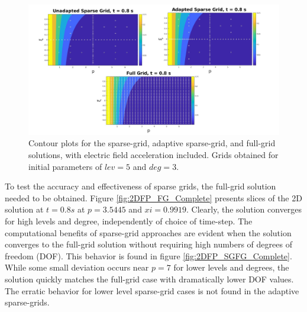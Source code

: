 \documentclass[preprint,11pt]{elsarticle}
\begin{document}
\begin{figure}[H]
    \centering
    \includegraphics[width=1.1\textwidth]{FIGURES/2DContour_AdaptSG.jpg}
    \caption{Contour plots for the sparse-grid, adaptive sparse-grid, and full-grid solutions, with electric field acceleration included. Grids obtained for initial parameters of $lev = 5$ and $deg = 3$.}
    \label{fig:2DAdaptContour}
\end{figure}

To test the accuracy and effectiveness of sparse grids, the full-grid solution needed to be obtained. Figure \ref{fig:2DFP_FG_Complete} presents slices of the 2D solution at $t = 0.8 s$ at $p = 3.5445$ and $xi = 0.9919$. Clearly, the solution converges for high levels and degree, independently of choice of time-step. The computational benefits of sparse-grid approaches are evident when the solution converges to the full-grid solution without requiring high numbers of degrees of freedom (DOF). This behavior is found in figure \ref{fig:2DFP_SGFG_Complete}. While some small deviation occurs near $p = 7$ for lower levels and degrees, the solution quickly matches the full-grid case with dramatically lower DOF values. The erratic behavior for lower level sparse-grid cases is not found in the adaptive sparse-grids. 
    
\end{document}
